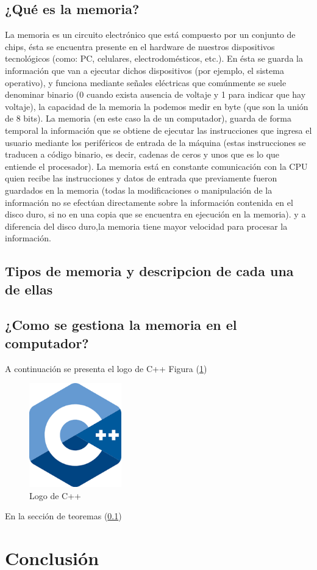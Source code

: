 \documentclass{article}
\begin{document}
\subsection{¿Qué es la memoria?} \label{contenido}
La memoria es un circuito electrónico que está compuesto por un conjunto de chips, ésta se encuentra presente en el hardware de nuestros dispositivos tecnológicos (como: PC, celulares, electrodomésticos, etc.). En ésta se guarda la información que van a ejecutar dichos dispositivos (por ejemplo, el sistema operativo), y funciona mediante señales eléctricas que comúnmente se suele denominar binario (0 cuando exista ausencia de voltaje y 1 para indicar que hay voltaje), la capacidad de la memoria la podemos medir en byte (que son la unión de 8 bits). La memoria (en este caso la de un computador), guarda de forma temporal la información que se obtiene de ejecutar las instrucciones que ingresa el usuario mediante los periféricos de entrada de la máquina (estas instrucciones se traducen a código binario, es decir, cadenas de ceros y unos que es lo que entiende el procesador). La memoria está en constante comunicación con la CPU quien recibe las instrucciones y datos de entrada que previamente fueron guardados en la memoria (todas la modificaciones o manipulación de la información no se efectúan directamente sobre la información contenida en el disco duro, si no en una copia que se encuentra en ejecución en la memoria). y a diferencia del disco duro,la memoria tiene mayor velocidad para procesar la información. 

\subsection{Tipos de memoria y descripcion de cada una de ellas}

\subsection{¿Como se gestiona la memoria en el computador?}

A continuación se presenta el logo de C++ Figura (\ref{fig:cpplogo})

\begin{figure}[h]
\includegraphics[width=4cm]{cpplogo.png}
\centering
\caption{Logo de C++}
\label{fig:cpplogo}
\end{figure}

En la sección de teoremas (\ref{contenido})

\section{Conclusión} \label{conclulsion}



\end{document}
